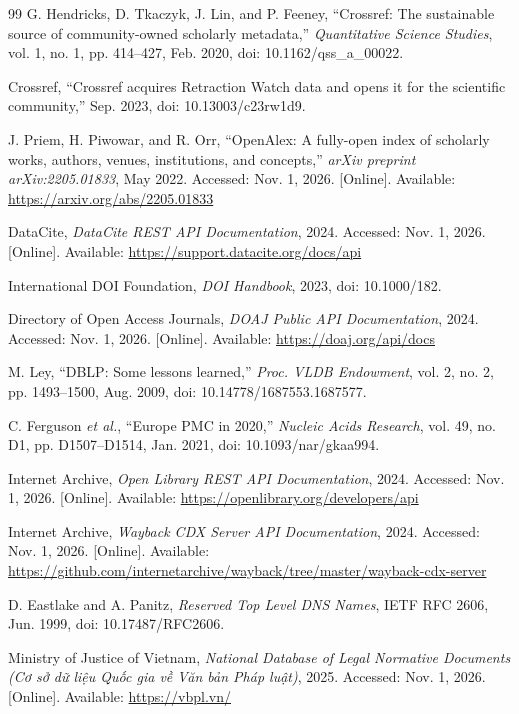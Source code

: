 \begin{thebibliography}{99}
G. Hendricks, D. Tkaczyk, J. Lin, and P. Feeney, ``Crossref: The sustainable source of community-owned scholarly metadata,'' \textit{Quantitative Science Studies}, vol. 1, no. 1, pp. 414--427, Feb. 2020, doi: 10.1162/qss\_a\_00022.

Crossref, ``Crossref acquires Retraction Watch data and opens it for the scientific community,'' Sep. 2023, doi: 10.13003/c23rw1d9.

J. Priem, H. Piwowar, and R. Orr, ``OpenAlex: A fully-open index of scholarly works, authors, venues, institutions, and concepts,'' \textit{arXiv preprint arXiv:2205.01833}, May 2022. Accessed: Nov. 1, 2026. [Online]. Available: \url{https://arxiv.org/abs/2205.01833}

DataCite, \textit{DataCite REST API Documentation}, 2024. Accessed: Nov. 1, 2026. [Online]. Available: \url{https://support.datacite.org/docs/api}

International DOI Foundation, \textit{DOI Handbook}, 2023, doi: 10.1000/182.

Directory of Open Access Journals, \textit{DOAJ Public API Documentation}, 2024. Accessed: Nov. 1, 2026. [Online]. Available: \url{https://doaj.org/api/docs}

M. Ley, ``DBLP: Some lessons learned,'' \textit{Proc. VLDB Endowment}, vol. 2, no. 2, pp. 1493--1500, Aug. 2009, doi: 10.14778/1687553.1687577.

C. Ferguson \textit{et al.}, ``Europe PMC in 2020,'' \textit{Nucleic Acids Research}, vol. 49, no. D1, pp. D1507--D1514, Jan. 2021, doi: 10.1093/nar/gkaa994.

Internet Archive, \textit{Open Library REST API Documentation}, 2024. Accessed: Nov. 1, 2026. [Online]. Available: \url{https://openlibrary.org/developers/api}

Internet Archive, \textit{Wayback CDX Server API Documentation}, 2024. Accessed: Nov. 1, 2026. [Online]. Available: \url{https://github.com/internetarchive/wayback/tree/master/wayback-cdx-server}

D. Eastlake and A. Panitz, \textit{Reserved Top Level DNS Names}, IETF RFC 2606, Jun. 1999, doi: 10.17487/RFC2606.

Ministry of Justice of Vietnam, \textit{National Database of Legal Normative Documents (Cơ sở dữ liệu Quốc gia về Văn bản Pháp luật)}, 2025. Accessed: Nov. 1, 2026. [Online]. Available: \url{https://vbpl.vn/}


\end{thebibliography}
